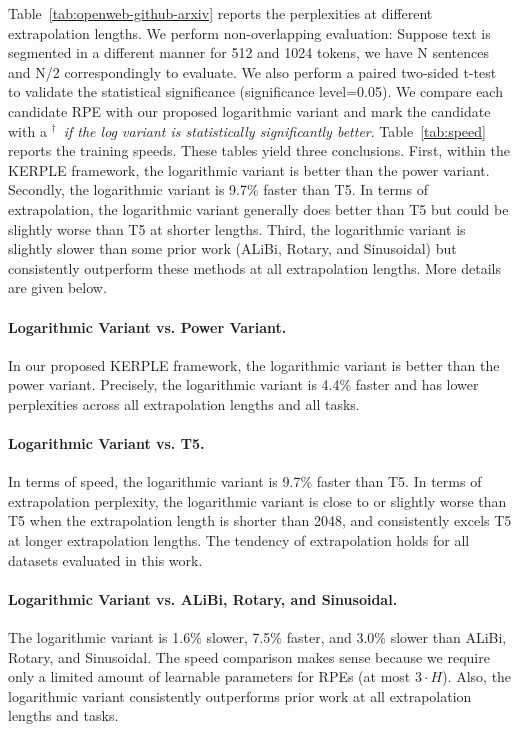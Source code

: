Table~\ref{tab:openweb-github-arxiv} reports the perplexities at different extrapolation lengths. We perform non-overlapping evaluation: Suppose text is segmented in a different manner for 512 and 1024 tokens, we have N sentences and N/2 correspondingly to evaluate. We also perform a paired two-sided t-test to validate the statistical significance (significance level=0.05). We compare each candidate RPE with our proposed logarithmic variant and mark the candidate with a $^\dagger$~\emph{if the log variant is statistically significantly better}. Table~\ref{tab:speed} reports the training speeds. These tables yield three conclusions. First, within the KERPLE framework, the logarithmic variant is better than the power variant. Secondly, the logarithmic variant is 9.7\% faster than T5. In terms of extrapolation, the logarithmic variant generally does better than T5 but could be slightly worse than T5 at shorter lengths. Third, the logarithmic variant is slightly slower than some prior work (ALiBi, Rotary, and Sinusoidal) but consistently outperform these methods at all extrapolation lengths. More details are given below.

\paragraph{Logarithmic Variant vs. Power Variant.} In our proposed KERPLE framework, the logarithmic variant is better than the power variant. Precisely, the logarithmic variant is 4.4\% faster and has lower perplexities across all extrapolation lengths and all tasks.

\paragraph{Logarithmic Variant vs. T5.} In terms of speed, the logarithmic variant is 9.7\% faster than T5. In terms of extrapolation perplexity, the logarithmic variant is close to or slightly worse than T5 when the extrapolation length is shorter than 2048, and consistently excels T5 at longer extrapolation lengths. The tendency of extrapolation holds for all datasets evaluated in this work. 

\paragraph{Logarithmic Variant vs. ALiBi, Rotary, and Sinusoidal.} The logarithmic variant is 1.6\% slower, 7.5\% faster, and 3.0\% slower than ALiBi, Rotary, and Sinusoidal. The speed comparison makes sense because we require only a limited amount of learnable parameters for RPEs (at most $3\cdot H$). Also, the logarithmic variant consistently outperforms prior work at all extrapolation lengths and tasks.

